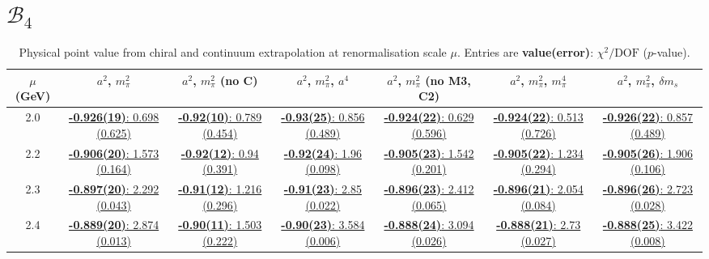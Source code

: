 \documentclass[12pt]{extarticle}
\begin{document}
\section{$\mathcal{B}_4$}
\begin{table}[h!]
\begin{center}
\begin{tabular}{|c|c|c|c|c|c|c|}
\hline
$\mu$ (GeV) & $a^2$, $m_\pi^2$& $a^2$, $m_\pi^2$ (no C)& $a^2$, $m_\pi^2$, $a^4$& $a^2$, $m_\pi^2$ (no M3, C2)& $a^2$, $m_\pi^2$, $m_\pi^4$& $a^2$, $m_\pi^2$, $\delta m_s$\\
\hline
2.0& \hyperlink{SSpPP/NPR/a2m2_20.pdf.1}{\textbf{-0.926(19)}: 0.698 (0.625)} & \hyperlink{SSpPP/NPR/a2m2noC_20.pdf.1}{\textbf{-0.92(10)}: 0.789 (0.454)} & \hyperlink{SSpPP/NPR/a2a4m2_20.pdf.1}{\textbf{-0.93(25)}: 0.856 (0.489)} & \hyperlink{SSpPP/NPR/a2m2mcut_20.pdf.1}{\textbf{-0.924(22)}: 0.629 (0.596)} & \hyperlink{SSpPP/NPR/a2m2m4_20.pdf.1}{\textbf{-0.924(22)}: 0.513 (0.726)} & \hyperlink{SSpPP/NPR/a2m2delm_20.pdf.1}{\textbf{-0.926(22)}: 0.857 (0.489)}\\
2.2& \hyperlink{SSpPP/NPR/a2m2_22.pdf.1}{\textbf{-0.906(20)}: 1.573 (0.164)} & \hyperlink{SSpPP/NPR/a2m2noC_22.pdf.1}{\textbf{-0.92(12)}: 0.94 (0.391)} & \hyperlink{SSpPP/NPR/a2a4m2_22.pdf.1}{\textbf{-0.92(24)}: 1.96 (0.098)} & \hyperlink{SSpPP/NPR/a2m2mcut_22.pdf.1}{\textbf{-0.905(23)}: 1.542 (0.201)} & \hyperlink{SSpPP/NPR/a2m2m4_22.pdf.1}{\textbf{-0.905(22)}: 1.234 (0.294)} & \hyperlink{SSpPP/NPR/a2m2delm_22.pdf.1}{\textbf{-0.905(26)}: 1.906 (0.106)}\\
2.3& \hyperlink{SSpPP/NPR/a2m2_23.pdf.1}{\textbf{-0.897(20)}: 2.292 (0.043)} & \hyperlink{SSpPP/NPR/a2m2noC_23.pdf.1}{\textbf{-0.91(12)}: 1.216 (0.296)} & \hyperlink{SSpPP/NPR/a2a4m2_23.pdf.1}{\textbf{-0.91(23)}: 2.85 (0.022)} & \hyperlink{SSpPP/NPR/a2m2mcut_23.pdf.1}{\textbf{-0.896(23)}: 2.412 (0.065)} & \hyperlink{SSpPP/NPR/a2m2m4_23.pdf.1}{\textbf{-0.896(21)}: 2.054 (0.084)} & \hyperlink{SSpPP/NPR/a2m2delm_23.pdf.1}{\textbf{-0.896(26)}: 2.723 (0.028)}\\
2.4& \hyperlink{SSpPP/NPR/a2m2_24.pdf.1}{\textbf{-0.889(20)}: 2.874 (0.013)} & \hyperlink{SSpPP/NPR/a2m2noC_24.pdf.1}{\textbf{-0.90(11)}: 1.503 (0.222)} & \hyperlink{SSpPP/NPR/a2a4m2_24.pdf.1}{\textbf{-0.90(23)}: 3.584 (0.006)} & \hyperlink{SSpPP/NPR/a2m2mcut_24.pdf.1}{\textbf{-0.888(24)}: 3.094 (0.026)} & \hyperlink{SSpPP/NPR/a2m2m4_24.pdf.1}{\textbf{-0.888(21)}: 2.73 (0.027)} & \hyperlink{SSpPP/NPR/a2m2delm_24.pdf.1}{\textbf{-0.888(25)}: 3.422 (0.008)}\\
\hline
\end{tabular}
\caption{Physical point value from chiral and continuum extrapolation at renormalisation scale $\mu$. Entries are \textbf{value(error)}: $\chi^2/\text{DOF}$ ($p$-value).}
\end{center}
\end{table}
\end{document}
